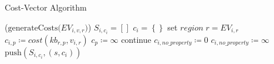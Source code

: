\documentclass[a4paper, 12pt]{article}
\begin{document}
\begin{algorithm}
\DontPrintSemicolon
\caption{Cost-Vector Algorithm}\label{costalgorithm}
\Begin($\text{generateCosts} {(} EV_{i,v,r} {)}$)
{
  $S_{i,c_{i}} = \left[ \right]$\;
  {
    $c_{i} = \left\lbrace \right\rbrace$\;
    set $region \; r = EV_{i,r}$\;
    {
      $c_{i,p} \coloneqq cost \left( kb_{r,p},v_{i,r} \right)$\;
      {
        $c_{p} \coloneqq \infty$
      }
      \Else
      {
        continue
      }
    }
    {
      $c_{i,no\_property} \coloneqq 0$
    }
    \Else
    {
      $c_{i,no\_property} \coloneqq \infty$
    }
    $\text{push} \left( S_{i,c_{i}}, \left( s,c_{i} \right) \right)$
  }\label{endfor}
}
\end{algorithm}
\end{document}
